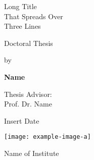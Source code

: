 \begin{titlepage}
    \begin{center}
         \Huge Long Title\\
		 That Spreads Over\\
		 Three Lines
       
        
        \vspace{2cm}
			\Large 
			Doctoral Thesis
			
			by

			\textbf{Name}
        
        
		\vspace{1cm}
		
		\large
            Thesis Advisor: \\
            Prof. Dr. Name
				 
        \vspace{1.5cm}
        Insert Date  
	\vfill
        
	\texttt{[image: example-image-a]}

	\vspace{.5cm}
		Name of Institute\\
    \end{center}
\end{titlepage}